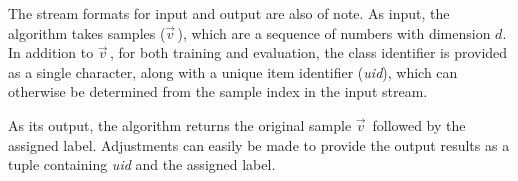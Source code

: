 \newcommand{\val}{$\vec{v}\,$\xspace}
The stream formats for input and output are also of note.
As input, the algorithm takes samples (\val), which are a sequence of numbers
with dimension $d$.
In addition to \val, for both training and evaluation, the class
identifier is provided as a single character, along with a unique item identifier
(\emph{uid}), which can otherwise be determined from the sample index in the input stream.

As its output, the algorithm returns the original sample \val followed by the
assigned label. Adjustments can easily be made to provide the output results as
a tuple containing \emph{uid} and the assigned label.



